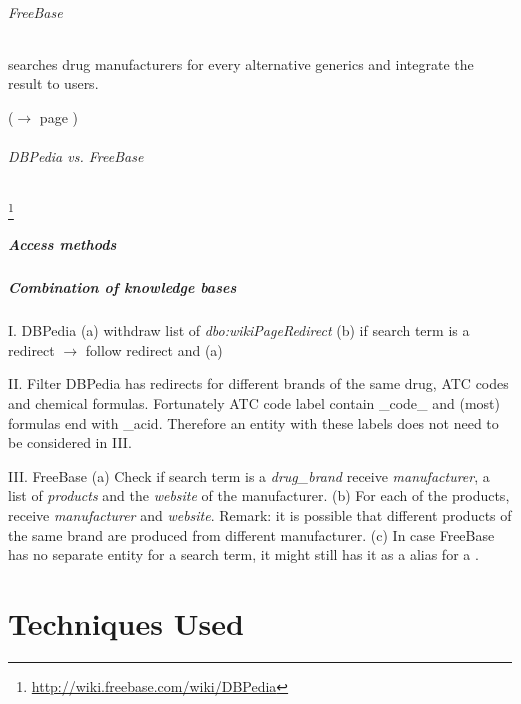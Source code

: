 \documentclass[11pt,titlepage,oneside,openany]{book}
\begin{document}
\subparagraph{FreeBase}
\label{freebase}
searches drug manufacturers for every alternative generics and integrate the result to users.

($\rightarrow$ page \pageref{prob:freebase})


\subparagraph{DBPedia vs. FreeBase}
\label{db_vs_fb}

\footnote{\url{http://wiki.freebase.com/wiki/DBPedia}}





\paragraph{Access methods}
\label{access_methods}



\paragraph{Combination of knowledge bases}
\label{dataset_combination}

I. DBPedia
(a) withdraw list of \textit{dbo:wikiPageRedirect}
(b) if search term is a redirect $\rightarrow$ follow redirect and (a)

II. Filter 
DBPedia has redirects for different brands of the same drug, ATC codes and chemical formulas. Fortunately ATC code label contain \_code\_ and (most) formulas end with \_acid. Therefore an entity with these labels does not need to be considered in III.

III. FreeBase
(a) Check if search term is a \textit{drug\_brand} receive \textit{manufacturer}, a list of \textit{products} and the \textit{website} of the manufacturer.
(b) For each of the products, receive \textit{manufacturer} and \textit{website}. 
Remark: it is possible that different products of the same brand are produced from different manufacturer.
(c) In case FreeBase has no separate entity for a search term, it might still has it as a alias for a .


\chapter{Techniques Used}
\label{cha:technique}
\end{document}
